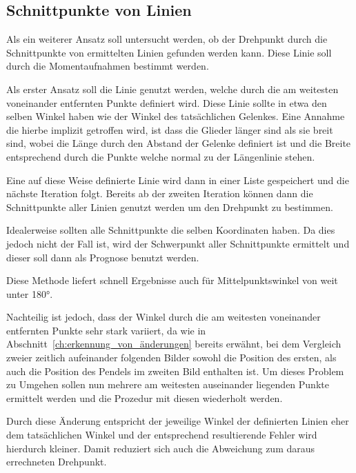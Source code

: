 \subsection{Schnittpunkte von Linien}

Als ein weiterer Ansatz soll untersucht werden, ob der Drehpunkt durch die Schnittpunkte von ermittelten Linien gefunden werden kann.
Diese Linie soll durch die Momentaufnahmen bestimmt werden.

Als erster Ansatz soll die Linie genutzt werden, welche durch die am weitesten voneinander entfernten Punkte definiert wird.
Diese Linie sollte in etwa den selben Winkel haben wie der Winkel des tatsächlichen Gelenkes.
Eine Annahme die hierbe implizit getroffen wird, ist dass die Glieder länger sind als sie breit sind, wobei die Länge durch den Abstand der Gelenke definiert ist und die Breite entsprechend durch die Punkte welche normal zu der Längenlinie stehen.

Eine auf diese Weise definierte Linie wird dann in einer Liste gespeichert und die nächste Iteration folgt.
Bereits ab der zweiten Iteration können dann die Schnittpunkte aller Linien genutzt werden um den Drehpunkt zu bestimmen.


Idealerweise sollten alle Schnittpunkte die selben Koordinaten haben.
Da dies jedoch nicht der Fall ist, wird der Schwerpunkt aller Schnittpunkte ermittelt und dieser soll dann als Prognose benutzt werden.

Diese Methode liefert schnell Ergebnisse auch für Mittelpunktswinkel von weit unter 180°.


Nachteilig ist jedoch, dass der Winkel durch die am weitesten voneinander entfernten Punkte sehr stark variiert, da wie in Abschnitt~\ref{ch:erkennung_von_änderungen} bereits erwähnt, bei dem Vergleich zweier zeitlich aufeinander folgenden Bilder sowohl die Position des ersten, als auch die Position des Pendels im zweiten Bild enthalten ist.
Um dieses Problem zu Umgehen sollen nun mehrere am weitesten auseinander liegenden Punkte ermittelt werden und die Prozedur mit diesen wiederholt werden.

Durch diese Änderung entspricht der jeweilige Winkel der definierten Linien eher dem tatsächlichen Winkel und der entsprechend resultierende Fehler wird hierdurch kleiner.
Damit reduziert sich auch die Abweichung zum daraus errechneten Drehpunkt.

